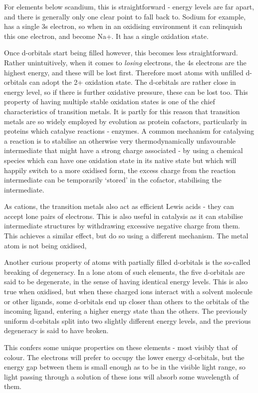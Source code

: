 For elements below scandium, this is straightforward - energy levels are far apart, and there is generally only one clear point to fall back to. Sodium for example, has a single 3s electron, so when in an oxidising environment it can relinquish this one electron, and become Na+. It has a single oxidation state.

Once d-orbitals start being filled however, this becomes less straightforward. Rather unintuitively, when it comes to \emph{losing} electrons, the 4s electrons are the highest energy, and these will be lost first. Therefore most atoms with unfilled d-orbitals can adopt the 2+ oxidation state. The d-orbitals are rather close in energy level, so if there is further oxidative pressure, these can be lost too. This property of having multiple stable oxidation states is one of the chief characteristics of transition metals. It is partly for this reason that transition metals are so widely employed by evolution as protein cofactors, particularly in proteins which catalyse reactions - enzymes. A common mechanism for catalysing a reaction is to stabilise an otherwise very thermodynamically unfavourable intermediate that might have a strong charge associated - by using a chemical species which can have one oxidation state in its native state but which will happily switch to a more oxidised form, the excess charge from the reaction intermediate can be temporarily `stored' in the cofactor, stabilising the intermediate.

As cations, the transition metals also act as efficient Lewis acids - they can accept lone pairs of electrons. This is also useful in catalysis as it can stabilise intermediate structures by withdrawing excessive negative charge from them. This achieves a similar effect, but do so using a different mechanism. The metal atom is not being oxidised, 

Another curious property of atoms with partially filled d-orbitals is the so-called breaking of degeneracy. In a lone atom of such elements, the five d-orbitals are said to be degenerate, in the sense of having identical energy levels. This is also true when oxidised, but when these charged ions interact with a solvent molecule or other ligands, some d-orbitals end up closer than others to the orbitals of the incoming ligand, entering a higher energy state than the others. The previously uniform d-orbitals split into two slightly different energy levels, and the previous degeneracy is said to have broken.

This confers some unique properties on these elements - most visibly that of colour. The electrons will prefer to occupy the lower energy d-orbitals, but the energy gap between them is small enough as to be in the visible light range, so light passing through a solution of these ions will absorb some wavelength of them.

